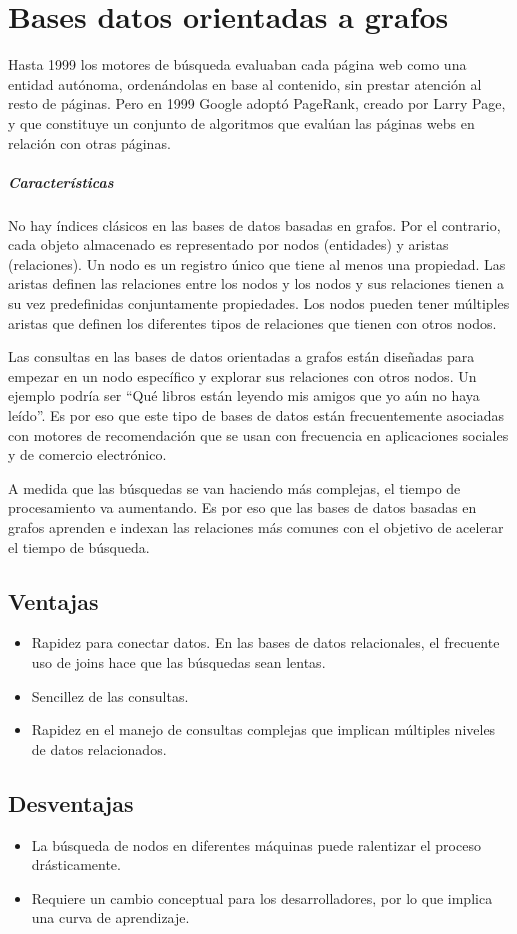 \section{Bases datos orientadas a grafos}
 Hasta 1999 los motores de búsqueda evaluaban cada página web como una entidad autónoma, ordenándolas en base al contenido, sin prestar atención al resto de páginas. Pero en 1999 Google adoptó PageRank, creado por Larry Page, y que constituye un conjunto de algoritmos que evalúan las páginas webs en relación con otras páginas.

\subparagraph{Características}
No hay índices clásicos en las bases de datos basadas en grafos. Por el contrario, cada objeto almacenado es representado por nodos (entidades) y aristas (relaciones). Un nodo es un registro único que tiene al menos una propiedad. Las aristas definen las relaciones entre los nodos y los nodos y sus relaciones tienen a su vez predefinidas conjuntamente propiedades. Los nodos pueden tener múltiples aristas que definen los diferentes tipos de relaciones que tienen con otros nodos.

Las consultas en las bases de datos orientadas a grafos están diseñadas para empezar en un nodo específico y explorar sus relaciones con otros nodos. Un ejemplo podría ser “Qué libros están leyendo mis amigos que yo aún no haya leído”. Es por eso que este tipo de bases de datos están frecuentemente asociadas con motores de recomendación que se usan con frecuencia en aplicaciones sociales y de comercio electrónico.

A medida que las búsquedas se van haciendo más complejas, el tiempo de procesamiento va aumentando. Es por eso que las bases de datos basadas en grafos aprenden e indexan las relaciones más comunes con el objetivo de acelerar el tiempo de búsqueda.
\subsection{Ventajas}
\begin{itemize}
  \item Rapidez para conectar datos. En las bases de datos relacionales, el frecuente uso de joins hace que las búsquedas sean lentas.
  \item Sencillez de las consultas.
  \item Rapidez en el manejo de consultas complejas que implican múltiples niveles de datos relacionados.
\end{itemize}
\subsection{Desventajas}
\begin{itemize}
  \item La búsqueda de nodos en diferentes máquinas puede ralentizar el proceso drásticamente.
  \item Requiere un cambio conceptual para los desarrolladores, por lo que implica una curva de aprendizaje.
\end{itemize}

